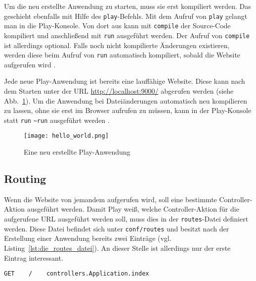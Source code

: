Um die neu erstellte Anwendung zu starten, muss sie erst kompiliert werden.
Das geschieht ebenfalls mit Hilfe des \lstinline|play|-Befehls.
Mit dem Aufruf von \lstinline|play| gelangt man in die Play-Konsole.
Von dort aus kann mit \lstinline|compile| der Source-Code kompiliert und anschließend mit \lstinline|run| ausgeführt werden.
Der Aufruf von \lstinline|compile| ist allerdings optional.
Falls noch nicht kompilierte Änderungen existieren, werden diese beim Aufruf von \lstinline|run| automatisch kompiliert, sobald die Website aufgerufen wird \cite[vgl.][]{play_compile}.

Jede neue Play-Anwendung ist bereits eine lauffähige Website.
Diese kann nach dem Starten unter der URL \url{http://localhost:9000/} abgerufen werden (siehe Abb.~\ref{fig:anwendung_nach_erstellung}).
Um die Anwendung bei Dateiänderungen automatisch neu kompilieren zu lassen, ohne sie erst im Browser aufrufen zu müssen, kann in der Play-Konsole statt \lstinline|run| \lstinline|~run| ausgeführt werden \cite[vgl.][S.~12--13]{play_for_scala_v8}.

\begin{figure}
\centering
\texttt{[image: hello\_world.png]}
\caption{Eine neu erstellte Play-Anwendung}
\label{fig:anwendung_nach_erstellung}
\end{figure}



\subsection{Routing} %
\label{sub:routing}

Wenn die Website von jemandem aufgerufen wird, soll eine bestimmte Controller-Aktion ausgeführt werden.
Damit Play weiß, welche Controller-Aktion für die aufgerufene URL ausgeführt werden soll, muss dies in der \lstinline|routes|-Datei definiert werden.
Diese Datei befindet sich unter \lstinline|conf/routes| und besitzt nach der Erstellung einer Anwendung bereits zwei Einträge (vgl. Listing~\ref{lst:die_routes_datei}).
An dieser Stelle ist allerdings nur der erste Eintrag interessant.

\begin{lstlisting}[caption=Die routes-Datei, label=lst:die_routes_datei]
  GET    /    controllers.Application.index
\end{lstlisting}

